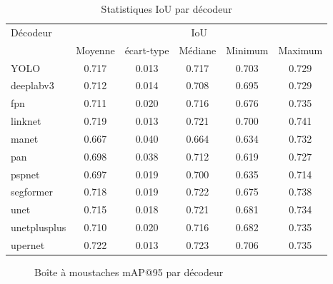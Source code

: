 \begin{table}[H]
    \centering
    \begin{tabular}{lccccc}
    \toprule
    Décodeur & \multicolumn{5}{c}{IoU} \\
    & Moyenne & écart-type & Médiane & Minimum & Maximum \\
    \midrule
    YOLO & 0.717 & 0.013 & 0.717 & 0.703 & 0.729 \\
    deeplabv3 & 0.712 & 0.014 & 0.708 & 0.695 & 0.729 \\
    fpn & 0.711 & 0.020 & 0.716 & 0.676 & 0.735 \\
    linknet & 0.719 & 0.013 & 0.721 & 0.700 & 0.741 \\
    manet & 0.667 & 0.040 & 0.664 & 0.634 & 0.732 \\
    pan & 0.698 & 0.038 & 0.712 & 0.619 & 0.727 \\
    pspnet & 0.697 & 0.019 & 0.700 & 0.635 & 0.714 \\
    segformer & 0.718 & 0.019 & 0.722 & 0.675 & 0.738 \\
    unet & 0.715 & 0.018 & 0.721 & 0.681 & 0.734 \\
    unetplusplus & 0.710 & 0.020 & 0.716 & 0.682 & 0.735 \\
    upernet & 0.722 & 0.013 & 0.723 & 0.706 & 0.735 \\
    \bottomrule
    \end{tabular}
    \caption{Statistiques IoU par décodeur}
    \label{tab:statistique_par_decodeur_iou}
\end{table}

\begin{figure}[H]
    \centering
    \caption{Boîte à moustaches mAP@95 par décodeur}
    \label{fig:ch4_06_architecture_boxplot_04_eval_test_map_95_mean}
\end{figure}

